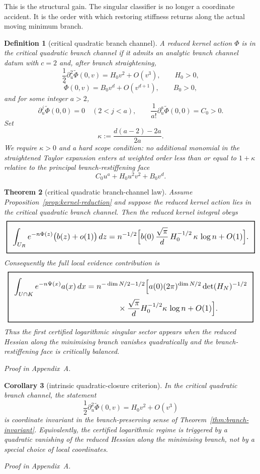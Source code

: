 \documentclass[11pt,a4paper]{article}
\numberwithin{equation}{section}
\newcommand{\geomboxed}[1]{%
  \setlength{\fboxsep}{8pt}%
  \setlength{\fboxrule}{0.9pt}%
  \fbox{\scalebox{1.12}{$\displaystyle #1$}}%
}
\theoremstyle{thmcompact}
\newtheorem{theorem}{Theorem}[section]
\newtheorem{corollary}[theorem]{Corollary}
\newtheorem{definition}[theorem]{Definition}
\theoremstyle{remark}
\newcommand{\proofappendix}{\par{\hfill\scriptsize\emph{Proof in Appendix~A.}}\par}
\begin{document}
This is the structural gain. The singular classifier is no longer a coordinate accident. It is the order with which restoring stiffness returns along the actual moving minimum branch.

\begin{definition}[critical quadratic branch channel]
A reduced kernel action $\Phi$ is in the \emph{critical quadratic branch channel} if it admits an analytic branch channel datum with $c=2$ and, after branch straightening,
\[
\frac12\partial_u^2\widetilde \Phi(0,v)=H_0 v^2 + O(v^3),
\qquad H_0>0,
\]
\[
\widetilde \Phi(0,v)=B_0 v^d + O(v^{d+1}),
\qquad B_0>0,
\]
and for some integer $a>2$,
\[
\partial_u^j \widetilde \Phi(0,0)=0 \quad (2<j<a),
\qquad
\frac1{a!}\partial_u^a \widetilde \Phi(0,0)=C_0>0.
\]
Set
\[
\kappa:=\frac{d(a-2)-2a}{2a}.
\]
We require $\kappa>0$ and a hard scope condition: no additional monomial in the straightened Taylor expansion enters at weighted order less than or equal to $1+\kappa$ relative to the principal branch-restiffening face
\[
C_0u^a + H_0u^2v^2 + B_0v^d.
\]
\end{definition}

\begin{theorem}[critical quadratic branch-channel law]\label{thm:branch-log}
Assume Proposition~\ref{prop:kernel-reduction} and suppose the reduced kernel action lies in the critical quadratic branch channel. Then the reduced kernel integral obeys
\[
\geomboxed{
\int_{U_R} e^{-n\Phi(z)}\bigl(b(z)+o(1)\bigr)\,dz
=
 n^{-1/2}
\Bigl[
 b(0)\,\frac{\sqrt{\pi}}{d}\,H_0^{-1/2}\,\kappa\,\log n
 + O(1)
\Bigr].}
\]
Consequently the full local evidence contribution is
\[
\geomboxed{
\begin{aligned}
\int_{U\cap K} e^{-n\Psi(x)}a(x)\,dx
&=
 n^{-\dim N/2-1/2}
\Bigl[
 a(0)(2\pi)^{\dim N/2}\det(H_N)^{-1/2}\\
&\qquad\qquad\times \frac{\sqrt{\pi}}{d}H_0^{-1/2}\kappa\,\log n
 + O(1)
\Bigr].
\end{aligned}}
\]
Thus the first certified logarithmic singular sector appears when the reduced Hessian along the minimising branch vanishes \emph{quadratically} and the branch-restiffening face is critically balanced.
\proofappendix
\end{theorem}

\begin{corollary}[intrinsic quadratic-closure criterion]\label{cor:branch-quadratic-closure}
In the critical quadratic branch channel, the statement
\[
\frac12\partial_u^2\widetilde \Phi(0,v)=H_0v^2+O(v^3)
\]
is coordinate invariant in the branch-preserving sense of Theorem~\ref{thm:branch-invariant}. Equivalently, the certified logarithmic regime is triggered by a quadratic vanishing of the reduced Hessian along the minimising branch, not by a special choice of local coordinates.
\proofappendix
\end{corollary}
\end{document}

